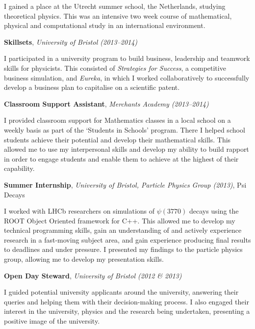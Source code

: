 \documentclass[11pt,a4paper,sans]{moderncv}
\begin{document}
I gained a place at the Utrecht summer school, the Netherlands, studying
theoretical physics. This was an intensive two week course of mathematical,
physical and computational study in an international environment.

\vspace{1em}

{\large\textbf{Skillsets}, \textit{University of Bristol (2013--2014)}}

I participated in a university program to build business, leadership and
teamwork skills for physicists. This consisted of \textit{Strategies for
Success}, a competitive business simulation, and \textit{Eureka}, in which I
worked collaboratively to successfully develop a business plan to capitalise on
a scientific patent.

\vspace{1em}

{\large\textbf{Classroom Support Assistant}, \textit{Merchants Academy (2013--2014)}}

I provided classroom support for Mathematics classes in a local school on a
weekly basis as part of the `Students in Schools' program. There I helped school
students achieve their potential and develop their mathematical skills. This
allowed me to use my interpersonal skills and develop my ability to build
rapport in order to engage students and enable them to achieve at the highest of
their capability.

\vspace{1em}

{\large\textbf{Summer Internship}, \textit{University of Bristol, Particle
Physics Group (2013)}, Psi Decays}

I worked with LHCb researchers on simulations of $\psi(3770)$ decays using the
ROOT Object Oriented framework for C++. This allowed me to develop my technical
programming skills, gain an understanding of and actively experience research in
a fast-moving subject area, and gain experience producing final results to
deadlines and under pressure. I presented my findings to the particle physics
group, allowing me to develop my presentation skills.

\vspace{1em}

{\large\textbf{Open Day Steward}, \textit{University of Bristol (2012 \& 2013)}
}

I guided potential university applicants around the university, answering their
queries and helping them with their decision-making process. I also engaged
their interest in the university, physics and the research being undertaken,
presenting a positive image of the university.
\end{document}
